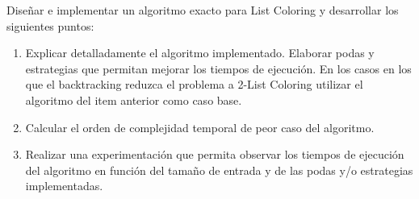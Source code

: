 Diseñar e implementar un algoritmo exacto para List Coloring y desarrollar los siguientes puntos:

\begin{enumerate}
 \item Explicar detalladamente el algoritmo implementado. Elaborar podas y estrategias que permitan
mejorar los tiempos de ejecución. En los casos en los que el backtracking reduzca el
problema a 2-List Coloring utilizar el algoritmo del item anterior como caso base.
\item Calcular el orden de complejidad temporal de peor caso del algoritmo.
\item Realizar una experimentación que permita observar los tiempos de ejecución del algoritmo en
función del tamaño de entrada y de las podas y/o estrategias implementadas.
\end{enumerate}
